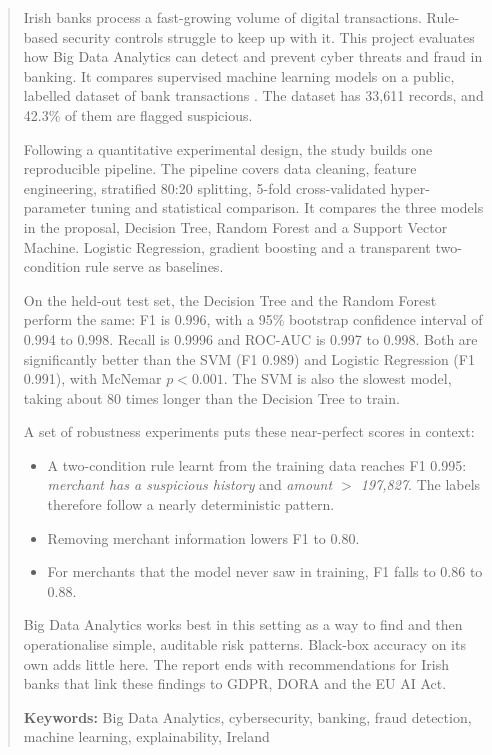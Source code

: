 \documentclass[12pt,a4paper]{article}
\begin{document}
\begin{abstract}
Irish banks process a fast-growing volume of digital transactions. Rule-based security controls struggle to keep up with it. This project evaluates how Big Data Analytics can detect and prevent cyber threats and fraud in banking. It compares supervised machine learning models on a public, labelled dataset of bank transactions \citep{kaggle2025dataset}. The dataset has 33{,}611 records, and 42.3\% of them are flagged suspicious.

Following a quantitative experimental design, the study builds one reproducible pipeline. The pipeline covers data cleaning, feature engineering, stratified 80:20 splitting, 5-fold cross-validated hyper-parameter tuning and statistical comparison. It compares the three models in the proposal, Decision Tree, Random Forest and a Support Vector Machine. Logistic Regression, gradient boosting and a transparent two-condition rule serve as baselines.

On the held-out test set, the Decision Tree and the Random Forest perform the same: F1 is 0.996, with a 95\% bootstrap confidence interval of 0.994 to 0.998. Recall is 0.9996 and ROC-AUC is 0.997 to 0.998. Both are significantly better than the SVM (F1 0.989) and Logistic Regression (F1 0.991), with McNemar $p<0.001$. The SVM is also the slowest model, taking about 80 times longer than the Decision Tree to train.

A set of robustness experiments puts these near-perfect scores in context:
\begin{itemize}[nosep]
\item A two-condition rule learnt from the training data reaches F1 0.995: \emph{merchant has a suspicious history} and \emph{amount $>$ 197{,}827}. The labels therefore follow a nearly deterministic pattern.
\item Removing merchant information lowers F1 to 0.80.
\item For merchants that the model never saw in training, F1 falls to 0.86 to 0.88.
\end{itemize}

Big Data Analytics works best in this setting as a way to find and then operationalise simple, auditable risk patterns. Black-box accuracy on its own adds little here. The report ends with recommendations for Irish banks that link these findings to GDPR, DORA and the EU AI Act.

\medskip
\textbf{Keywords:} Big Data Analytics, cybersecurity, banking, fraud detection, machine learning, explainability, Ireland
\end{abstract}
\end{document}
